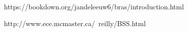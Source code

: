 https://bookdown.org/jandeleeuw6/bras/introduction.html

http://www.ece.mcmaster.ca/~reilly/BSS.html